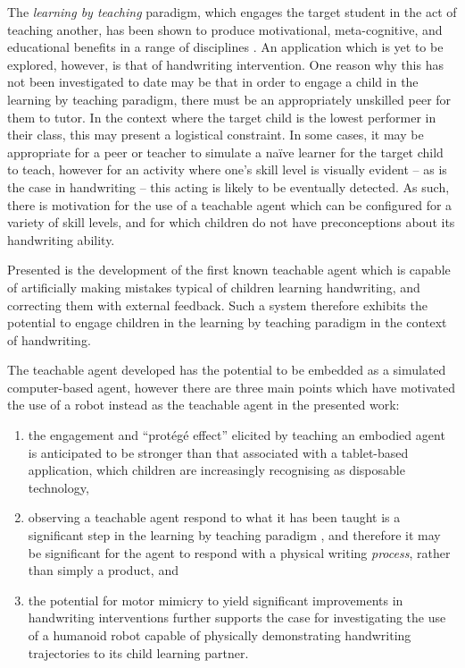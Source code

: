 \documentclass{sig-alternate}
\begin{document}
The \emph{learning by teaching} paradigm, which engages the target student in
the act of teaching another, has been shown to produce motivational,
meta-cognitive, and educational benefits in a range of disciplines
\cite{Rohrbeck2003}. An application which is yet to be explored, however, is
that of handwriting intervention. One reason why this has not been investigated
to date may be that in order to engage a child in the learning by teaching
paradigm, there must be an appropriately unskilled peer for them to tutor. In
the context where the target child is the lowest performer in their class, this
may present a logistical constraint. In some cases, it may be appropriate for a
peer or teacher to simulate a na\"ive learner for the target child to teach,
however for an activity where one's skill level is visually evident -- as is the
case in handwriting -- this acting is likely to be eventually detected. As such,
there is motivation for the use of a teachable agent which can be configured for
a variety of skill levels, and for which children do not have preconceptions
about its handwriting ability.

Presented is the development of the first known teachable agent which is capable
of artificially making mistakes typical of children learning handwriting, and
correcting them with external feedback. Such a system therefore exhibits the potential
to engage children in the learning by teaching paradigm in the context of
handwriting. 

The teachable agent developed has the potential to be embedded as a simulated 
computer-based agent, however there are three main points which have motivated 
the use of a robot instead as the teachable agent in the presented work:

\begin{enumerate}
    \item the engagement and ``protégé effect'' elicited by teaching an embodied
        agent is anticipated to be stronger than that associated with a
        tablet-based application, which children are increasingly recognising as
        disposable technology,%
%
%

    \item observing a teachable agent respond to what it has been taught
        is a significant step in the learning by teaching
        paradigm \cite{Okita2006}, and therefore it may be significant for the agent to respond
        with a physical writing \emph{process}, rather than simply a product, and

    \item the potential for motor mimicry to yield significant improvements in
        handwriting interventions \cite{Berninger1997} further supports the case
        for investigating the use of a humanoid robot capable of physically
        demonstrating handwriting trajectories to its child learning partner.
\end{enumerate}
\end{document}
